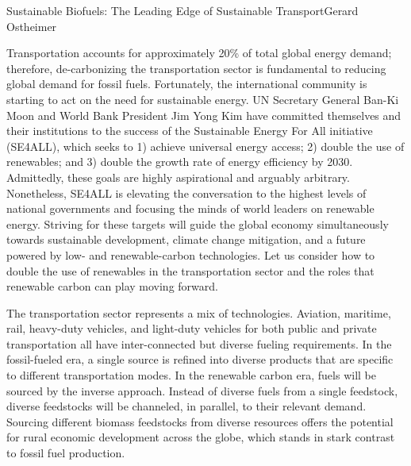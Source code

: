 \documentclass[10pt]{papertex}
\begin{document}
\makeatletter
\renewcommand{\papertex@headDateTime}{
    \raisebox{-5pt}
    {\fontsize{5mm}{6mm}\usefont{T1}{bch}{b}{n}{April 2014}}
    }
\makeatother


\begin{news}{2}{Sustainable Biofuels: The Leading Edge of Sustainable 
    Transport}{Gerard Ostheimer}{}{}

Transportation accounts for approximately 20\% of total global energy demand; 
therefore, de-carbonizing the transportation sector is fundamental to reducing 
global demand for fossil fuels. Fortunately, the international community is 
starting to act on the need for sustainable energy. UN Secretary General 
Ban-Ki Moon and World Bank President Jim Yong Kim have committed themselves 
and their institutions to the success of the Sustainable Energy For All 
initiative (SE4ALL), which seeks to 1) achieve universal energy access; 2) 
double the use of renewables; and 3) double the growth rate of energy 
efficiency by 2030. Admittedly, these goals are highly aspirational and 
arguably arbitrary. Nonetheless, SE4ALL is elevating the conversation to the 
highest levels of national governments and focusing the minds of world leaders 
on renewable energy. Striving for these targets will guide the global economy 
simultaneously towards sustainable development, climate change mitigation, and 
a future powered by low- and renewable-carbon technologies. Let us consider 
how to double the use of renewables in the transportation sector and the roles 
that renewable carbon can play moving forward.

The transportation sector represents a mix of technologies. Aviation, 
maritime, rail, heavy-duty vehicles, and light-duty vehicles for both public 
and private transportation all have inter-connected but diverse fueling 
requirements. In the fossil-fueled era, a single source is refined into 
diverse products that are specific to different transportation modes. In the 
renewable carbon era, fuels will be sourced by the inverse approach. Instead 
of diverse fuels from a single feedstock, diverse feedstocks will be 
channeled, in parallel, to their relevant demand. Sourcing different biomass 
feedstocks from diverse resources offers the potential for rural economic 
development across the globe, which stands in stark contrast to fossil fuel 
production.


\end{news}
\end{document}
